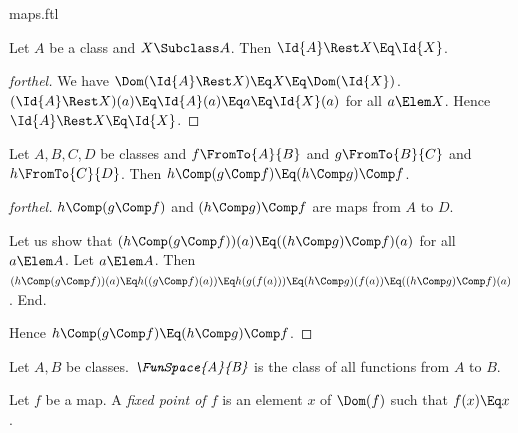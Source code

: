 \documentclass{stex}
\begin{document}
\begin{smodule}{maps.ftl}
\begin{proposition*}[forthel]
  Let $A$ be a class and $X \Subclass A$.
  Then $\Id{A} \Rest X \Eq \Id{X}$.
\end{proposition*}
\begin{proof}[forthel]
  We have $\Dom(\Id{A} \Rest X)
    \Eq X
    \Eq \Dom(\Id{X})$.
  $(\Id{A} \Rest X)(a)
    \Eq \Id{A}(a)
    \Eq a
    \Eq \Id{X}(a)$
  for all $a \Elem X$.
  Hence $\Id{A} \Rest X \Eq \Id{X}$.
\end{proof}

\begin{proposition*}[forthel]
  Let $A, B, C, D$ be classes and $f \FromTo{A}{B}$ and $g \FromTo{B}{C}$ and $h \FromTo{C}{D}$.
  Then $h \Comp (g \Comp f) \Eq (h \Comp g) \Comp f$.
\end{proposition*}
\begin{proof}[forthel]
  $h \Comp (g \Comp f)$ and $(h \Comp g) \Comp f$ are maps from $A$ to $D$.

  Let us show that $(h \Comp (g \Comp f))(a) \Eq ((h \Comp g) \Comp f)(a)$ for all $a \Elem A$.
    Let $a \Elem A$.
    Then $(h \Comp (g \Comp f))(a)
      \Eq h((g \Comp f)(a))
      \Eq h(g(f(a)))
      \Eq (h \Comp g)(f(a))
      \Eq ((h \Comp g) \Comp f)(a)$.
  End.

  Hence $h \Comp (g \Comp f) \Eq (h \Comp g) \Comp f$.
\end{proof}

\begin{definition*}[forthel,for=FunSpace]
  Let $A, B$ be classes.
  $\emph{\FunSpace{A}{B}}$ is the class of all functions from $A$ to $B$.
\end{definition*}

\begin{definition*}[forthel,for=fixed point]
  Let $f$ be a map.
  A \emph{fixed point of $f$} is an element $x$ of $\Dom(f)$ such that $f(x) \Eq x$.
\end{definition*}

\end{smodule}
\end{document}
